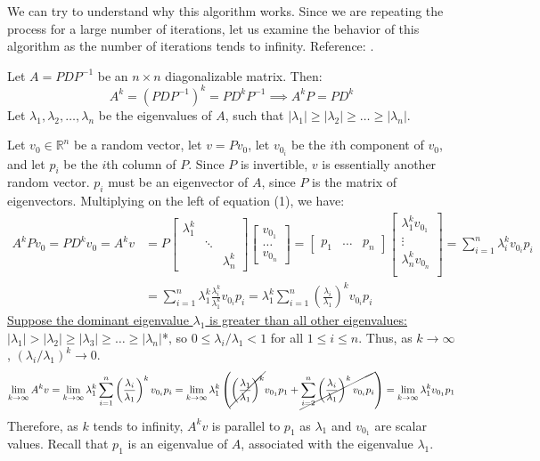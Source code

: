 \documentclass{article}
\begin{document}
We can try to understand why this algorithm works. Since we are repeating the process for a large number of iterations, let us examine the behavior of this algorithm as the number of iterations tends to infinity. Reference: \cite{cornellnotes}.

Let $A=PDP^{-1}$ be an $n\times n$ diagonalizable matrix. Then:
\begin{equation}
	A^k
	=\left(PDP^{-1}\right)^k
	=PD^{k}P^{-1} \implies A^kP=PD^k
\end{equation}
Let $\lambda_1,\lambda_2,\ldots,\lambda_n$ be the eigenvalues of $A$, such that $\left|\lambda_1\right|\geq \left|\lambda_2\right|\geq \ldots\geq \left|\lambda_n\right|$.

Let $v_0\in\mathbb R^n$ be a random vector, let $v=Pv_0$, let $v_{0_i}$ be the $i$th component of $v_0$, and let $p_i$ be the $i$th column of $P$. Since $P$ is invertible, $v$ is essentially another random vector. $p_i$ must be an eigenvector of $A$, since $P$ is the matrix of eigenvectors. Multiplying on the left of equation (1), we have:
\begin{align*}
	A^kPv_0=PD^kv_0
	=A^k v 
	&= P \begin{bmatrix}
		\lambda_1^k & & \\
		& \ddots & \\
		& & \lambda_n^k
	\end{bmatrix}
	\begin{bmatrix}
		v_{0_1} \\ \dots \\ v_{0_n}
	\end{bmatrix}
	=\begin{bmatrix}
		p_1 & \ldots & p_n
	\end{bmatrix} \begin{bmatrix}
		\lambda_1^k v_{0_1} \\ 
		\vdots \\
		\lambda_n^k v_{0_n} \\ 
	\end{bmatrix}
	=\sum_{i=1}^{n}\lambda_i^k v_{0_i} p_i \\
	&=\sum_{i=1}^{n}\lambda_1^k\frac{\lambda_i^k}{\lambda_1^k} v_{0_i} p_i
	=\lambda_1^k \sum_{i=1}^{n}\left(\frac{\lambda_i}{\lambda_1}\right)^k v_{0_i}p_i
\end{align*}
\ul{Suppose the dominant eigenvalue $\lambda_1$ is greater than all other eigenvalues: $\left|\lambda_1\right|>\left|\lambda_2\right|\geq \left|\lambda_3\right|\geq\ldots\geq \left|\lambda_n\right|$}*, so $0\leq\lambda_i/\lambda_1<1$ for all $1\leq i\leq n$. Thus, as $k\to\infty$, $\left(\lambda_i/\lambda_1\right)^k\to0$.
\begin{equation*}
    \lim_{k\to\infty}A^kv
	=\lim_{k\to\infty}\lambda_1^k \sum_{i=1}^{n}\left(\frac{\lambda_i}{\lambda_1}\right)^k v_{0_i}p_i
	=\lim_{k\to\infty}\lambda_1^k \left(\cancel{\left(\frac{\lambda_1}{\lambda_1}\right)^k} v_{0_1}p_1+\cancel{\sum_{i=2}^{n}\left(\frac{\lambda_i}{\lambda_1}\right)^k v_{0_i}p_i}\right)
	=\lim_{k\to\infty}\lambda_1^k v_{0_1}{p_1}
\end{equation*}
Therefore, as $k$ tends to infinity, $A^kv$ is parallel to $p_1$ as $\lambda_1$ and $v_{0_1}$ are scalar values. Recall that $p_1$ is an eigenvalue of $A$, associated with the eigenvalue $\lambda_1$.
\end{document}
